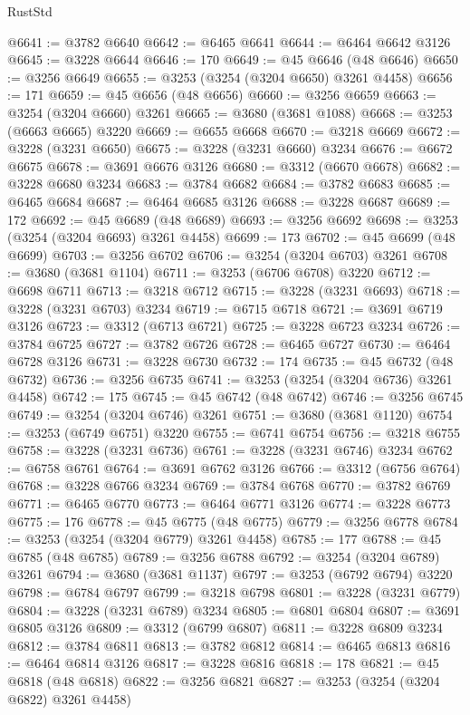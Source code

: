 \begin{lexlean}{RustStd}
\begin{coremodule}
@6641 := @3782 @6640
@6642 := @6465 @6641
@6644 := @6464 @6642 @3126
@6645 := @3228 @6644
@6646 := 170
@6649 := @45 @6646 (@48 @6646)
@6650 := @3256 @6649
@6655 := @3253 (@3254 (@3204 @6650) @3261 @4458)
@6656 := 171
@6659 := @45 @6656 (@48 @6656)
@6660 := @3256 @6659
@6663 := @3254 (@3204 @6660) @3261
@6665 := @3680 (@3681 @1088)
@6668 := @3253 (@6663 @6665) @3220
@6669 := @6655 @6668
@6670 := @3218 @6669
@6672 := @3228 (@3231 @6650)
@6675 := @3228 (@3231 @6660) @3234
@6676 := @6672 @6675
@6678 := @3691 @6676 @3126
@6680 := @3312 (@6670 @6678)
@6682 := @3228 @6680 @3234
@6683 := @3784 @6682
@6684 := @3782 @6683
@6685 := @6465 @6684
@6687 := @6464 @6685 @3126
@6688 := @3228 @6687
@6689 := 172
@6692 := @45 @6689 (@48 @6689)
@6693 := @3256 @6692
@6698 := @3253 (@3254 (@3204 @6693) @3261 @4458)
@6699 := 173
@6702 := @45 @6699 (@48 @6699)
@6703 := @3256 @6702
@6706 := @3254 (@3204 @6703) @3261
@6708 := @3680 (@3681 @1104)
@6711 := @3253 (@6706 @6708) @3220
@6712 := @6698 @6711
@6713 := @3218 @6712
@6715 := @3228 (@3231 @6693)
@6718 := @3228 (@3231 @6703) @3234
@6719 := @6715 @6718
@6721 := @3691 @6719 @3126
@6723 := @3312 (@6713 @6721)
@6725 := @3228 @6723 @3234
@6726 := @3784 @6725
@6727 := @3782 @6726
@6728 := @6465 @6727
@6730 := @6464 @6728 @3126
@6731 := @3228 @6730
@6732 := 174
@6735 := @45 @6732 (@48 @6732)
@6736 := @3256 @6735
@6741 := @3253 (@3254 (@3204 @6736) @3261 @4458)
@6742 := 175
@6745 := @45 @6742 (@48 @6742)
@6746 := @3256 @6745
@6749 := @3254 (@3204 @6746) @3261
@6751 := @3680 (@3681 @1120)
@6754 := @3253 (@6749 @6751) @3220
@6755 := @6741 @6754
@6756 := @3218 @6755
@6758 := @3228 (@3231 @6736)
@6761 := @3228 (@3231 @6746) @3234
@6762 := @6758 @6761
@6764 := @3691 @6762 @3126
@6766 := @3312 (@6756 @6764)
@6768 := @3228 @6766 @3234
@6769 := @3784 @6768
@6770 := @3782 @6769
@6771 := @6465 @6770
@6773 := @6464 @6771 @3126
@6774 := @3228 @6773
@6775 := 176
@6778 := @45 @6775 (@48 @6775)
@6779 := @3256 @6778
@6784 := @3253 (@3254 (@3204 @6779) @3261 @4458)
@6785 := 177
@6788 := @45 @6785 (@48 @6785)
@6789 := @3256 @6788
@6792 := @3254 (@3204 @6789) @3261
@6794 := @3680 (@3681 @1137)
@6797 := @3253 (@6792 @6794) @3220
@6798 := @6784 @6797
@6799 := @3218 @6798
@6801 := @3228 (@3231 @6779)
@6804 := @3228 (@3231 @6789) @3234
@6805 := @6801 @6804
@6807 := @3691 @6805 @3126
@6809 := @3312 (@6799 @6807)
@6811 := @3228 @6809 @3234
@6812 := @3784 @6811
@6813 := @3782 @6812
@6814 := @6465 @6813
@6816 := @6464 @6814 @3126
@6817 := @3228 @6816
@6818 := 178
@6821 := @45 @6818 (@48 @6818)
@6822 := @3256 @6821
@6827 := @3253 (@3254 (@3204 @6822) @3261 @4458)

\end{coremodule}
\end{lexlean}
